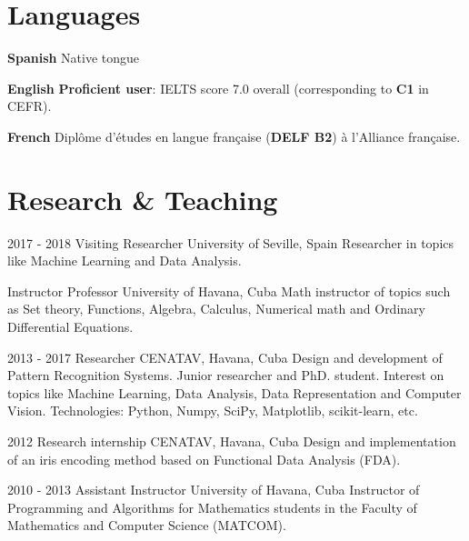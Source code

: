 \documentclass[]{friggeri-cv}
\begin{document}
\section{Languages}
\begin{entrylist}
  \entry
    {\textbf{Spanish}}
    {}
    {}
    {Native tongue}

  \entry
    {\textbf{English}}
    {}
    {}
    {
      \textbf{Proficient user}: IELTS score 7.0 overall (corresponding to \textbf{C1} in CEFR).
    }

  \entry
    {\textbf{French}}
    {}
    {}
    {Diplôme d'études en langue française (\textbf{DELF B2}) à l'Alliance française.}
\end{entrylist}

\section{Research \& Teaching}
\begin{entrylist}
  \entry
    {2017 - 2018}
    {Visiting Researcher}
    {University of Seville, Spain}
    {Researcher in topics like Machine Learning and Data Analysis.\\}

  \entry
    {}
    {Instructor Professor}
    {University of Havana, Cuba}
    {Math instructor of topics such as Set theory, Functions, Algebra, Calculus, Numerical math and Ordinary Differential Equations.\\}

  \entry
    {2013 - 2017}
    {Researcher}
    {CENATAV, Havana, Cuba}
    {Design and development of Pattern Recognition Systems. Junior researcher and PhD. student. Interest on topics like Machine Learning, Data Analysis, Data Representation and Computer Vision. Technologies: Python, Numpy, SciPy, Matplotlib, scikit-learn, etc.\\}

  \entry
    {2012}
    {Research internship}
    {CENATAV, Havana, Cuba}
    {Design and implementation of an iris encoding method based on Functional Data Analysis (FDA).\\}
    
  \entry
    {2010 - 2013}
    {Assistant Instructor}
    {University of Havana, Cuba}
    {Instructor of Programming and Algorithms for Mathematics students in the Faculty of Mathematics and Computer Science (MATCOM).\\}
\end{entrylist}
\end{document}
